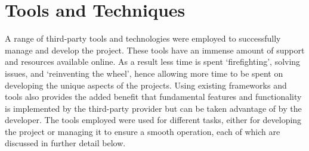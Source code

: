 \section{Tools and Techniques}
A range of third-party tools and technologies were employed to successfully manage and develop the project. These tools have an immense amount of support and resources available online. As a result less time is spent `firefighting', solving issues, and `reinventing the wheel', hence allowing more time to be spent on developing the unique aspects of the projects. Using existing frameworks and tools also provides the added benefit that fundamental features and functionality is implemented by the third-party provider but can be taken advantage of by the developer. The tools employed were used for different tasks, either for developing the project or managing it to ensure a smooth operation, each of which are discussed in further detail below.

